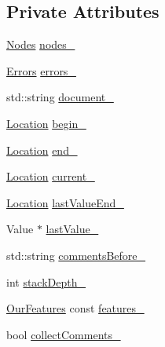 \subsection*{Private Attributes}
\begin{DoxyCompactItemize}
\item 
\hyperlink{class_json_1_1_our_reader_a8480a5ef159cee3a090f96358414d8d3}{Nodes} \hyperlink{class_json_1_1_our_reader_a19cc4e8c5d17ee6822f752e9a36f4ce3}{nodes\+\_\+}
\item 
\hyperlink{class_json_1_1_our_reader_a8cc69593ef7303e58e99bb5dbb767562}{Errors} \hyperlink{class_json_1_1_our_reader_afb76b68ba1ab68fe09cf2838e3d4898d}{errors\+\_\+}
\item 
std\+::string \hyperlink{class_json_1_1_our_reader_aeb9b8bb85fa8a4dd72e546bb3104c597}{document\+\_\+}
\item 
\hyperlink{class_json_1_1_our_reader_a1bdc7bbc52ba87cae6b19746f2ee0189}{Location} \hyperlink{class_json_1_1_our_reader_a9bda9d72335d52cd06e65f9eca3f70f5}{begin\+\_\+}
\item 
\hyperlink{class_json_1_1_our_reader_a1bdc7bbc52ba87cae6b19746f2ee0189}{Location} \hyperlink{class_json_1_1_our_reader_ab1f69b0260c27a0d2d65dc56e42c8f9d}{end\+\_\+}
\item 
\hyperlink{class_json_1_1_our_reader_a1bdc7bbc52ba87cae6b19746f2ee0189}{Location} \hyperlink{class_json_1_1_our_reader_a5211fbbba94be80a22dd2317c621efcc}{current\+\_\+}
\item 
\hyperlink{class_json_1_1_our_reader_a1bdc7bbc52ba87cae6b19746f2ee0189}{Location} \hyperlink{class_json_1_1_our_reader_a101eadc45e01c60628b53f0db3d13482}{last\+Value\+End\+\_\+}
\item 
Value $\ast$ \hyperlink{class_json_1_1_our_reader_a9f994b6a2227c5d96e6ed6cbc74ed251}{last\+Value\+\_\+}
\item 
std\+::string \hyperlink{class_json_1_1_our_reader_a2e8fd643b2e85155f5292db8fc9c6084}{comments\+Before\+\_\+}
\item 
int \hyperlink{class_json_1_1_our_reader_aaa91c93bc064c7086248ea01eddcf51a}{stack\+Depth\+\_\+}
\item 
\hyperlink{class_json_1_1_our_features}{Our\+Features} const \hyperlink{class_json_1_1_our_reader_a2714302d5cc54ca2ce4118ea51c0397a}{features\+\_\+}
\item 
bool \hyperlink{class_json_1_1_our_reader_a259f6ac988da2894bcafc670e42f73ad}{collect\+Comments\+\_\+}
\end{DoxyCompactItemize}


